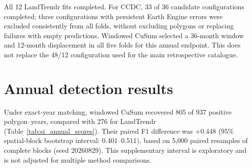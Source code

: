 \documentclass[11pt,a4paper]{article}
\begin{document}
All 12 LandTrendr fits completed. For CCDC, 33 of 36 candidate configurations completed; three configurations with persistent Earth Engine errors were excluded consistently from all folds, without excluding polygons or replacing failures with empty predictions. Windowed CuSum selected a 36-month window and 12-month displacement in all five folds for this annual endpoint. This does not replace the 48/12 configuration used for the main retrospective catalogue.

\section{Annual detection results}
\label{sec:si_annual_results}
Under exact-year matching, windowed CuSum recovered 805 of 937 positive polygon--years, compared with 276 for LandTrendr (Table~\ref{tab:si_annual_scores}). Their paired F1 difference was $+0.448$ (95\% spatial-block bootstrap interval: 0.401--0.511), based on 5,000 paired resamples of complete blocks (seed 20260829). This supplementary interval is exploratory and is not adjusted for multiple method comparisons.
\end{document}
